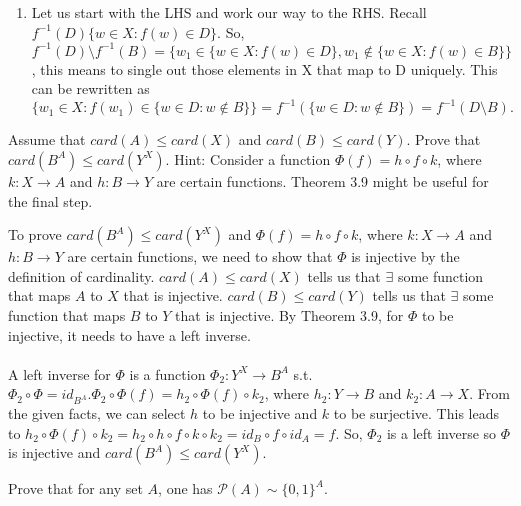 \documentclass[12pt,letterpaper,boxed]{hmcpset}
\begin{document}
\begin{solution}
\begin{enumerate}
\begin{enumerate}
		\end{enumerate}
	\item Let us start with the LHS and work our way to the RHS. Recall $f^{-1}(D)\{w \in X : f(w) \in D\}.$ So, $f^{-1}(D)\setminus f^{-1}(B)= \{ w_1 \in \{ w \in X : f(w)\in D\}, w_1 \notin \{ w \in X : f(w)\in B\} \}$, this means to single out those elements in X that map to D uniquely. This can be rewritten as $\{ w_1 \in X : f(w_1) \in \{ w \in D : w \notin B \} \} = f^{-1}(\{w \in D : w \notin B \}) = f^{-1}(D\setminus B).$
\end{enumerate}
\end{solution}

\begin{problem}[Exercise 4.5]
Assume that $card(A) \leq card(X)$ and $card(B) \leq card(Y).$ Prove that $card(B^{A}) \leq card(Y^{X})$. Hint: Consider a function $\Phi(f) = h \circ f \circ k$,
where $k : X \rightarrow A$ and $h : B \rightarrow Y$ are certain functions. Theorem 3.9 might be useful for the final step.
 \end{problem}

\begin{solution}
To prove $card(B^{A}) \leq card(Y^{X})$ and $\Phi(f) = h \circ f \circ k$,
where $k : X \rightarrow A$ and $h : B \rightarrow Y$ are certain functions, we need to show that $\Phi$ is injective by the definition of cardinality. $card(A) \leq card(X)$ tells us that $\exists$ some function that maps $A$ to $X$ that is injective. $card(B) \leq card(Y)$ tells us that $\exists$ some function that maps $B$ to $Y$ that is injective. By Theorem 3.9, for $\Phi$ to be injective, it needs to have a left inverse. \\ \\
A left inverse for $\Phi$ is a function $\Phi_2 : Y^{X} \rightarrow B^{A}$ s.t. $\Phi_2 \circ \Phi = id_{B^{A}}. \Phi_2 \circ \Phi(f) = h_2 \circ \Phi(f) \circ k_2$, where $h_2 : Y\rightarrow B$ and $k_2:A\rightarrow X.$ From the given facts, we can select $h$ to be injective and $k$ to be surjective. This leads to $h_2 \circ \Phi(f) \circ k_2 = h_2 \circ h \circ f \circ k \circ k_2 = id_{B}\circ f \circ id_{A}=f.$ So, $\Phi_2$ is a left inverse so $\Phi$ is injective and $card(B^{A}) \leq card(Y^{X}).$
\end{solution}

\begin{problem}[Exercise 4.7]
Prove that for any set $A$, one has $\mathcal{P}(A) \sim \{0,1\}^{A}$.
\end{problem}
\end{document}
